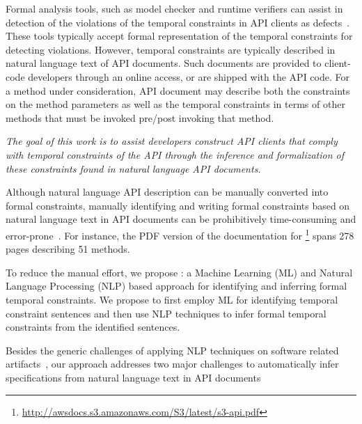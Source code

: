 Formal analysis tools, such as model checker and runtime verifiers can assist in detection of the violations of the temporal constraints in API clients as defects~\cite{lee2012towards}.
These tools typically accept formal representation of the temporal constraints for detecting violations.
However, temporal constraints are typically described in natural language text of API documents.
Such documents are provided to client-code developers through an online access, or are shipped with the API code.
For a method under consideration, API document may describe both the constraints on the method parameters
as well as the temporal constraints in terms of other methods that must be invoked pre/post invoking that method.

\textit{The goal of this work is to assist developers construct API clients that comply with
	temporal constraints of the API through the inference and formalization of these constraints found in natural language API documents.}

Although natural language API description can be manually converted into formal constraints,
manually identifying and writing formal constraints based on natural language text in API documents can be prohibitively time-consuming and error-prone~\cite{wu2013inferring,RubingerWEB10}. 
For instance, the PDF version of the documentation for \amazonAPI\footnote{{\small \url{http://awsdocs.s3.amazonaws.com/S3/latest/s3-api.pdf}}} spans 278 pages describing 51 methods.


To reduce the manual effort, we propose \tool: a Machine Learning (ML) and Natural Language Processing (NLP) based approach
for identifying and inferring formal temporal constraints. 
We propose to first employ ML for identifying temporal constraint sentences and then use NLP techniques to infer formal temporal constraints from the identified sentences. 

Besides the generic challenges of applying NLP techniques on software related artifacts~\cite{pandita12:inferring},
our approach addresses two major challenges to automatically infer specifications from natural language text in API documents 

